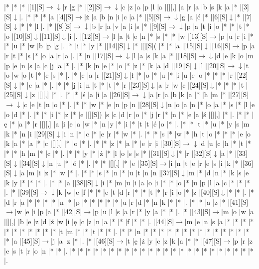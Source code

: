 \documentclass[11pt]{article}
\newcommand\drarr{$\rightarrow \!\!\!\!\! \downarrow$}
\newcommand\rarr{$\rightarrow$}
\newcommand\darr{$\downarrow$}
\begin{document}
\noindent\begin{Puzzle}{23}{27}|*	|*	|*	|[1][S]\drarr	|r	|g	|*	|[2][S]\drarr	|c	|z	|a	|p	|l	|a	|[][,]{ }	|a	|r	|a	|b	|s	|k	|a	|*	|[3][S]\darr	|.
|*	|*	|*	|a	|[4][S]\rarr	|ż	|a	|b	|n	|i	|c	|a	|*	|[5][S]\drarr	|g	|a	|ć	|*	|[6][S]\darr	|*	|[7][S]\darr	|*	|*	|l	|.
|*	|[8][S]\drarr	|b	|r	|a	|v	|a	|i	|s	|*	|[9][S]\drarr	|p	|a	|t	|i	|o	|*	|*	|t	|*	|o	|[10][S]\darr	|[11][S]\darr	|i	|.
|[12][S]\rarr	|l	|a	|t	|e	|n	|*	|s	|*	|*	|w	|[13][S]\rarr	|p	|u	|r	|i	|*	|*	|u	|*	|w	|b	|p	|g	|.
|*	|i	|*	|y	|*	|[14][S]\darr	|*	|[][S](	|*	|*	|a	|[15][S]\darr	|[16][S]\rarr	|p	|a	|r	|t	|*	|s	|*	|o	|a	|r	|a	|.
|*	|n	|[17][S]\drarr	|l	|a	|s	|k	|a	|*	|[18][S]\drarr	|d	|e	|k	|o	|m	|p	|e	|n	|s	|a	|c	|j	|a	|*	|.
|*	|k	|n	|e	|*	|o	|*	|z	|*	|k	|a	|d	|[19][S]\darr	|l	|[20][S]\drarr	|t	|o	|w	|o	|t	|*	|e	|s	|*	|.
|*	|e	|a	|r	|[21][S]\darr	|ł	|*	|o	|*	|u	|*	|i	|u	|e	|o	|*	|*	|*	|r	|[22][S]\darr	|*	|c	|a	|*	|.
|*	|*	|j	|i	|n	|t	|*	|t	|*	|r	|[23][S]\darr	|a	|r	|w	|c	|[24][S]\darr	|*	|*	|*	|t	|[25][S]\darr	|z	|[][,]{ }	|*	|.
|*	|*	|ś	|a	|i	|a	|[26][S]\drarr	|a	|r	|a	|b	|k	|a	|*	|h	|m	|*	|[27][S]\drarr	|c	|e	|t	|n	|o	|*	|.
|*	|*	|w	|*	|e	|n	|p	|n	|[28][S]\darr	|n	|o	|a	|n	|*	|o	|a	|*	|s	|*	|l	|e	|o	|d	|*	|.
|*	|*	|i	|*	|z	|*	|e	|[][S])	|s	|c	|d	|r	|o	|*	|j	|r	|*	|n	|*	|e	|a	|ś	|[][,]{ }	|*	|.
|*	|*	|ę	|*	|a	|*	|r	|[][,]{ }	|a	|i	|e	|a	|w	|*	|n	|y	|*	|i	|*	|t	|t	|ć	|o	|*	|.
|*	|*	|t	|*	|u	|*	|y	|s	|m	|k	|*	|n	|i	|[29][S]\darr	|i	|n	|*	|c	|*	|e	|r	|*	|w	|*	|.
|*	|*	|s	|*	|w	|*	|h	|t	|o	|*	|*	|*	|e	|o	|k	|a	|*	|a	|*	|c	|[][,]{ }	|*	|o	|*	|.
|*	|*	|z	|*	|a	|*	|e	|r	|i	|[30][S]\drarr	|d	|u	|c	|h	|*	|t	|*	|*	|*	|h	|m	|*	|c	|*	|.
|*	|*	|y	|*	|ż	|*	|l	|o	|s	|s	|*	|[31][S]\darr	|*	|r	|[32][S]\darr	|a	|*	|[33][S]\darr	|[34][S]\darr	|n	|u	|*	|ó	|*	|.
|*	|*	|[][,]{ }	|*	|e	|[35][S]\rarr	|i	|n	|t	|e	|r	|e	|s	|i	|k	|*	|[36][S]\darr	|a	|m	|i	|z	|*	|w	|*	|.
|*	|*	|s	|*	|n	|*	|u	|t	|n	|n	|[37][S]\darr	|m	|*	|d	|n	|*	|k	|s	|e	|k	|y	|*	|*	|*	|.
|*	|*	|a	|[38][S]\darr	|i	|*	|m	|u	|i	|a	|o	|i	|*	|*	|o	|*	|u	|p	|l	|a	|c	|*	|*	|*	|.
|*	|[39][S]\drarr	|k	|w	|e	|f	|*	|*	|e	|t	|d	|r	|*	|*	|t	|*	|r	|i	|o	|*	|z	|[40][S]\darr	|*	|*	|.
|*	|d	|r	|a	|*	|*	|*	|*	|n	|*	|p	|*	|*	|*	|*	|*	|u	|r	|d	|*	|n	|k	|*	|*	|.
|*	|*	|a	|z	|*	|[41][S]\rarr	|w	|e	|i	|p	|a	|*	|[42][S]\rarr	|p	|u	|l	|s	|a	|r	|*	|y	|a	|*	|*	|.
|*	|[43][S]\rarr	|m	|o	|w	|a	|[][,]{ }	|b	|e	|z	|d	|ź	|w	|i	|ę	|c	|z	|n	|a	|*	|*	|f	|*	|*	|.
|[44][S]\rarr	|m	|e	|n	|s	|a	|*	|*	|*	|*	|*	|*	|*	|*	|*	|*	|*	|t	|m	|*	|*	|t	|*	|*	|.
|*	|*	|n	|*	|*	|*	|*	|*	|*	|*	|*	|*	|*	|*	|*	|*	|*	|*	|a	|[45][S]\rarr	|j	|a	|z	|*	|.
|*	|[46][S]\rarr	|t	|ę	|ż	|y	|c	|z	|k	|a	|*	|*	|[47][S]\rarr	|p	|r	|z	|e	|s	|t	|r	|o	|n	|*	|*	|.
|*	|*	|*	|*	|*	|*	|*	|*	|*	|*	|*	|*	|*	|*	|*	|*	|*	|*	|*	|*	|*	|*	|*	|*	|.\end{Puzzle}
\end{document}

